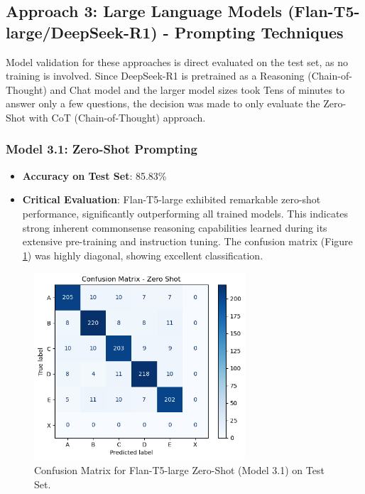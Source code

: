 \documentclass[10.5pt]{article}
\begin{document}
\subsection{Approach 3: Large Language Models (Flan-T5-large/DeepSeek-R1) - Prompting Techniques}
Model validation for these approaches is direct evaluated on the test set, as no training is involved.
Since DeepSeek-R1 is pretrained as a Reasoning (Chain-of-Thought) and Chat model and the larger model sizes took Tens of minutes to answer only a few questions, the decision was made to only evaluate the Zero-Shot with CoT (Chain-of-Thought) approach.

\subsubsection{Model 3.1: Zero-Shot Prompting}
\begin{itemize}
    \item \textbf{Accuracy on Test Set}: 85.83\%
    \item \textbf{Critical Evaluation}: Flan-T5-large exhibited remarkable zero-shot performance, significantly outperforming all trained models. This indicates strong inherent commonsense reasoning capabilities learned during its extensive pre-training and instruction tuning. The confusion matrix (Figure \ref{fig:conf_matrix_model3_1}) was highly diagonal, showing excellent classification.
\end{itemize}

\begin{figure}[htbp]
    \centering
    \includegraphics[width=0.7\textwidth]{images/model3_1_confusion_matrix.png}
    \caption{Confusion Matrix for Flan-T5-large Zero-Shot (Model 3.1) on Test Set.}
    \label{fig:conf_matrix_model3_1}
\end{figure}
\end{document}
